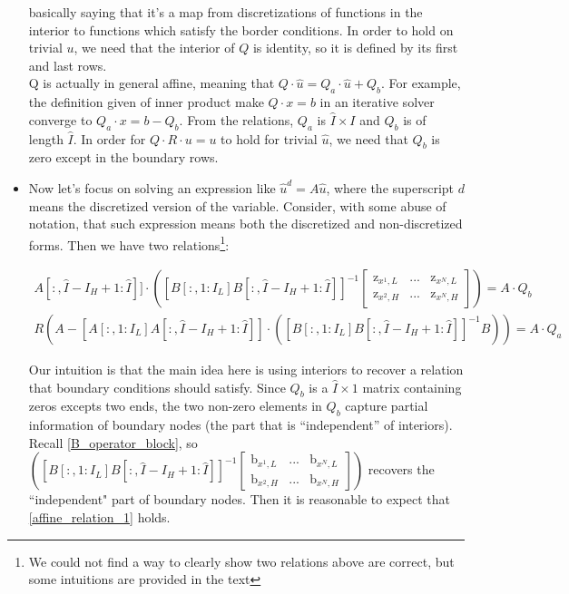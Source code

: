 \documentclass[11pt]{article}
\begin{document}
\begin{itemize}
		basically saying that it's a map from discretizations of functions in the interior to functions which satisfy the border conditions. In order to hold on trivial $u$, we need that the interior of $Q$ is identity, so it is defined by its first and last rows.\\
		Q is actually in general affine, meaning that $Q\cdot \hat{u} = Q_a\cdot \hat{u} + Q_b$. For example, the definition given of inner product make $Q\cdot x=b$ in an iterative solver converge to $Q_a\cdot x = b - Q_b$. From the relations, $Q_a$ is $\hat{I}\times I$ and $Q_b$ is of length $\hat{I}$. In order for $Q\cdot R\cdot u = u$ to hold for trivial $\hat{u}$, we need that $Q_b$ is zero except in the boundary rows.
		
		\item Now let's focus on solving an expression like $\hat{u}^d = A \hat{u}$, where the superscript $d$ means the discretized version of the variable. Consider, with some abuse of notation, that such expression means both the discretized and non-discretized forms. Then we have two relations\footnote{We could not find a way to clearly show two relations above are correct, but some intuitions are provided in the text}:
		
		\begin{align}
		[A[:, 1:I_L] A[:,\hat{I}-I_H+1:\hat{I}]]\cdot\left([B[:,1:I_L] B[:,\hat{I}-I_H+1:\hat{I}]]^{-1}\begin{bmatrix}
		\text{z}_{x^{1},L} & ... & \text{z}_{x^{N},L}\\
		\text{z}_{x^{2},H} & ... & \text{z}_{x^{N},H}
		\end{bmatrix}\right) = A\cdot Q_b\label{affine_relation_1}
		\end{align}
		\begin{align}
		R(A-[A[:,1:I_L] A[:,\hat{I}-I_H+1:\hat{I}]]\cdot([B[:,1:I_L] B[:,\hat{I}-I_H+1:\hat{I}]]^{-1} B)) = A\cdot Q_a\label{affine_relation_2}
		\end{align}
		
		Our intuition is that the main idea here is using interiors to recover a relation that boundary conditions should satisfy. Since $Q_b$ is a $\hat{I}\times 1$ matrix containing zeros excepts two ends, the two non-zero elements in $Q_b$ capture partial information of boundary nodes (the part that is ``independent'' of interiors).  Recall \eqref{B_operator_block}, so $\left([B[:,1:I_L] B[:,\hat{I}-I_H+1:\hat{I}]]^{-1}\begin{bmatrix}
		\text{b}_{x^{1},L} & ... & \text{b}_{x^{N},L}\\
		\text{b}_{x^{2},H} & ... & \text{b}_{x^{N},H}
		\end{bmatrix}\right)$ recovers the ``independent" part of boundary nodes. Then it is reasonable to expect that \eqref{affine_relation_1} holds.
		

\end{itemize}
\end{document}
